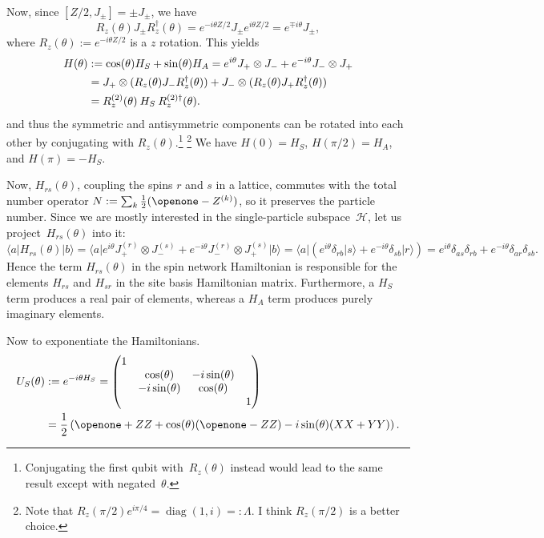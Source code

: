 \documentclass[aps,pra,12pt,nofootinbib,superscriptaddress,longbibliography,showpacs]{revtex4-1}
\theoremstyle{plain}
\theoremstyle{definition}
\newcommand{\bra}[1]{\mbox{$\langle #1|$}}
\newcommand{\ket}[1]{\ensuremath{|#1\rangle}}
\newcommand{\comm}[2]{\ensuremath{\left[#1, #2\right]}}
\DeclareMathOperator{\diag}{diag}
\newcommand{\I}{\openone}     %
\newcommand{\hilb}[1]{\ensuremath{\mathcal{#1}}} %
\newcommand{\be}{\begin{equation}}
\newcommand{\ee}{\end{equation}}
\begin{document}
Now, since $\comm{Z/2}{J_\pm} = \pm J_\pm$, we have
\be
R_z(\theta) J_\pm R_z^\dagger(\theta)
= e^{-i \theta Z/2} J_\pm e^{i \theta Z/2}
= e^{\mp i \theta} J_\pm,
\ee
where $R_z(\theta):= e^{-i \theta Z/2}$ is a $z$ rotation.
This yields
\begin{align}
\notag
H(\theta)
&:= \cos(\theta) H_S +\sin(\theta) H_A
= e^{i \theta} J_+  \otimes J_- +e^{-i \theta} J_- \otimes J_+\\
\notag
&=  J_+ \otimes (R_{z}(\theta) J_- R_{z}^\dagger(\theta)) +J_- \otimes (R_{z}(\theta) J_+ R_{z}^\dagger(\theta))\\
&= R_{z}^{(2)}(\theta) \: H_S \: R_{z}^{(2)\dagger}(\theta).
\end{align}
and thus the symmetric and antisymmetric components can be rotated into each other by
conjugating with $R_z(\theta)$.\footnote{Conjugating the first qubit with~$R_z(\theta)$ instead would
lead to the same result except with negated~$\theta$.}
\footnote{Note that $R_z(\pi/2) e^{i \pi/4} = \diag(1, i) =:
  \Lambda$. I think $R_z(\pi/2)$ is a better choice.}
We have
$H(0) = H_S$, 
$H(\pi/2) = H_A$, and
$H(\pi) = -H_S$. 

Now, $H_{rs}(\theta)$, coupling the spins $r$ and $s$ in a lattice,
commutes with the total number operator
$N := \sum_k \tfrac{1}{2}(\I -Z^{(k)})$,
so it preserves the particle number. Since we are mostly interested in
the single-particle subspace~$\hilb{H}$, let us project~$H_{rs}(\theta)$ into it:
\be
\bra{a} H_{rs}(\theta) \ket{b}
= \bra{a} e^{i \theta} J_+^{(r)}  \otimes J_-^{(s)} +e^{-i \theta} J_-^{(r)} \otimes J_+^{(s)} \ket{b}
= \bra{a} \left(e^{i \theta} \delta_{rb} \ket{s} +e^{-i \theta} \delta_{sb} \ket{r}\right)
= e^{i \theta} \delta_{as} \delta_{rb} +e^{-i \theta} \delta_{ar} \delta_{sb}.
\ee
Hence the term $H_{rs}(\theta)$ in the spin network Hamiltonian
is responsible for the elements $H_{rs}$ and $H_{sr}$ in the
site basis Hamiltonian matrix. Furthermore, a $H_S$ term produces
a real pair of elements, whereas a $H_A$ term produces purely
imaginary elements.

Now to exponentiate the Hamiltonians.
\begin{align}
\notag
U_S(\theta) &:= e^{-i \theta H_S}
= 
\begin{pmatrix}
1\\
& \cos(\theta) & -i \sin(\theta)\\
& -i \sin(\theta) & \cos(\theta)\\
& & & 1
\end{pmatrix}\\
&= \frac{1}{2}\left(\I +ZZ +\cos(\theta)(\I-ZZ) -i \sin(\theta)(XX+YY)\right).
\end{align}
\end{document}
